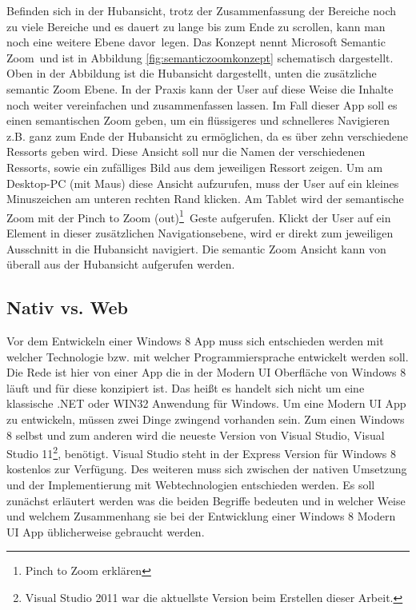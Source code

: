 \documentclass[12pt,a4paper,bibtotoc]{scrartcl}
\begin{document}
Befinden sich in der Hubansicht, trotz der Zusammenfassung der Bereiche noch zu viele Bereiche und es dauert zu lange bis zum Ende zu scrollen, kann man noch eine weitere Ebene \glqq davor\grqq\ legen. Das Konzept nennt Microsoft \glqq Semantic Zoom\grqq\ und ist in Abbildung \ref{fig:semanticzoomkonzept} schematisch dargestellt. Oben in der Abbildung ist die Hubansicht dargestellt, unten die zusätzliche semantic Zoom Ebene. In der Praxis kann der User auf diese Weise die Inhalte noch weiter vereinfachen und zusammenfassen lassen. Im Fall dieser App soll es einen semantischen Zoom geben, um ein flüssigeres und schnelleres Navigieren z.B. ganz zum Ende der Hubansicht zu ermöglichen, da es über zehn verschiedene Ressorts geben wird. Diese Ansicht soll nur die Namen der verschiedenen Ressorts, sowie ein zufälliges Bild aus dem jeweiligen Ressort zeigen. Um am Desktop-PC (mit Maus) diese Ansicht aufzurufen, muss der User auf ein kleines Minuszeichen am unteren rechten Rand klicken. Am Tablet wird der semantische Zoom mit der \glqq Pinch to Zoom (out)\footnote{Pinch to Zoom erklären}\grqq\  Geste aufgerufen. Klickt der User auf ein Element in dieser zusätzlichen Navigationsebene, wird er direkt zum jeweiligen Ausschnitt in die Hubansicht navigiert. Die semantic Zoom Ansicht kann von überall aus der Hubansicht aufgerufen werden.  


\subsection{Nativ vs. Web}
\label{subsec:nativ_vs_web}
Vor dem Entwickeln einer Windows 8 App muss sich entschieden werden mit welcher Technologie bzw. mit welcher Programmiersprache entwickelt werden soll. Die Rede ist hier von einer App die in der Modern UI Oberfläche von Windows 8 läuft und für diese konzipiert ist. Das heißt es handelt sich nicht um eine klassische .NET oder WIN32 Anwendung für Windows. Um eine Modern UI App zu entwickeln, müssen zwei Dinge zwingend vorhanden sein. Zum einen Windows 8 selbst und zum anderen wird die neueste Version von Visual Studio, Visual Studio 11\footnote{Visual Studio 2011 war die aktuellste Version beim Erstellen dieser Arbeit.}, benötigt. Visual Studio steht in der Express Version für Windows 8 kostenlos zur Verfügung. Des weiteren muss sich zwischen der nativen Umsetzung und der Implementierung mit Webtechnologien entschieden werden. Es soll zunächst erläutert werden was die beiden Begriffe bedeuten und in welcher Weise und welchem Zusammenhang sie bei der Entwicklung einer Windows 8 Modern UI App üblicherweise gebraucht werden.
\end{document}
